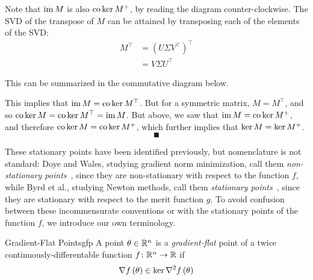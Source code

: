 \documentclass[../../thesis.tex]{subfiles}
\begin{document}
Note that $\operatorname*{im} M$ is also $\operatorname*{co}\ker M^{+}$,
by reading the diagram counter-clockwise.
The SVD of the transpose of $M$
can be attained by transposing each of the elements of the SVD\@:
\begin{align}
	M^\top
	&= {\left(U \Sigma V^\top\right)}^\top\\
	&= V \Sigma U^\top
\end{align}

This can be summarized in the commutative diagram below.

\begin{center}
\end{center}

This implies that $\operatorname*{im} M = \operatorname*{co}\ker M^\top$.
But for a symmetric matrix,
$M = M^\top$,
and so $\operatorname*{co}\ker M = \operatorname*{co}\ker M^\top = \operatorname*{im} M$.
But above, we saw that $\operatorname*{im} M = \operatorname*{co}\ker M^{+}$,
and therefore $\operatorname*{co}\ker M = \operatorname*{co}\ker M^{+}$,
which further implies that $\ker M = \ker M^{+}$.
\[\QED\]

These stationary points have been identified previously,
but nomenclature is not standard:
Doye and Wales, studying gradient norm minimization,
call them \emph{non-stationary points}~\cite{doye2002},
since they are non-stationary with respect to the function $f$,
while Byrd et al., studying Newton methods,
call them \emph{stationary points}~\cite{byrd2004},
since they are stationary with respect to the merit function $g$.
To avoid confusion between these incommensurate conventions
or with the stationary points of the function $f$,
we introduce our own terminology.

\begin{definition}{Gradient-Flat Points}{gfp}
	A point $\theta\in\mathbb{R}^n$ is a \emph{gradient-flat} point
	of a twice continuously-differentable function
	$f\colon\mathbb{R}^n\to\mathbb{R}$ if
	\begin{equation}
		\nabla f\left(\theta\right) \in \ker \nabla^2f\left(\theta\right)
	\end{equation}
\end{definition}
\end{document}
